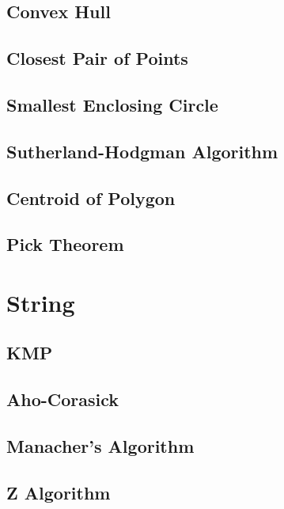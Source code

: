 \subsection{Convex Hull}

\subsection{Closest Pair of Points}

\subsection{Smallest Enclosing Circle}

\subsection{Sutherland-Hodgman Algorithm}

\subsection{Centroid of Polygon}

\subsection{Pick Theorem}

\section{String}
\subsection{KMP}

\subsection{Aho-Corasick}

\subsection{Manacher's Algorithm}

\subsection{Z Algorithm}

